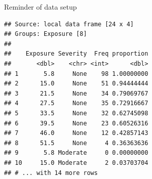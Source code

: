 \begin{frame}[fragile]{Reminder of data setup}

  \begin{footnotesize}
\begin{knitrout}
\color{fgcolor}\begin{kframe}
\begin{alltt}
\end{alltt}
\begin{verbatim}
## Source: local data frame [24 x 4]
## Groups: Exposure [8]
## 
##    Exposure Severity  Freq proportion
##       <dbl>    <chr> <int>      <dbl>
## 1       5.8     None    98 1.00000000
## 2      15.0     None    51 0.94444444
## 3      21.5     None    34 0.79069767
## 4      27.5     None    35 0.72916667
## 5      33.5     None    32 0.62745098
## 6      39.5     None    23 0.60526316
## 7      46.0     None    12 0.42857143
## 8      51.5     None     4 0.36363636
## 9       5.8 Moderate     0 0.00000000
## 10     15.0 Moderate     2 0.03703704
## # ... with 14 more rows
\end{verbatim}
\end{kframe}
\end{knitrout}
  \end{footnotesize}
\end{frame}


